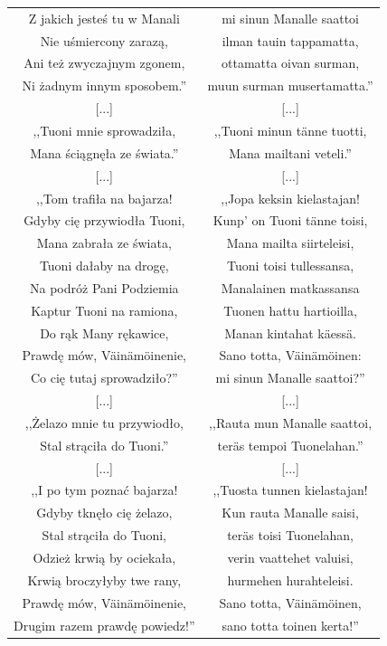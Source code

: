 \documentclass[11pt,a4paper,twoside]{report}
\begin{document}
{\begin{longtable}{c c}
Z jakich jesteś tu w Manali		&  mi sinun Manalle saattoi \\
Nie uśmiercony zarazą, 			&  ilman tauin tappamatta, \\
Ani też zwyczajnym zgonem, 		&  ottamatta oivan surman, \\
Ni żadnym innym sposobem.'' 		&  muun surman musertamatta.'' \\
{[...]} & {[...]}\\
,,Tuoni mnie sprowadziła, 		&  ,,Tuoni minun tänne tuotti, \\
Mana ściągnęła ze świata.'' 	&  Mana mailtani veteli.'' \\
{[...]} & {[...]}\\
,,Tom trafiła na bajarza! 			&  ,,Jopa keksin kielastajan! \\
Gdyby cię przywiodła Tuoni, 		&  Kunp' on Tuoni tänne toisi, \\
Mana zabrała ze świata, 			&  Mana mailta siirteleisi, \\
Tuoni dałaby na drogę, 			&  Tuoni toisi tullessansa, \\
Na podróż Pani Podziemia		&  Manalainen matkassansa	 \\
Kaptur Tuoni na ramiona, 		&  Tuonen hattu hartioilla, \\
Do rąk Many rękawice, 			&  Manan kintahat käessä. \\
Prawdę mów, Väinämöinenie, 		&  Sano totta, Väinämöinen: \\
Co cię tutaj sprowadziło?'' 		&  mi sinun Manalle saattoi?'' \\
{[...]} & {[...]}\\
,,Żelazo mnie tu przywiodło, 		&  ,,Rauta mun Manalle saattoi, \\
Stal strąciła do Tuoni.'' 			&  teräs tempoi Tuonelahan.'' \\
{[...]} & {[...]}\\
,,I po tym poznać bajarza! 		&  ,,Tuosta tunnen kielastajan! \\
Gdyby tknęło cię żelazo, 			&  Kun rauta Manalle saisi, \\
Stal strąciła do Tuoni, 			&  teräs toisi Tuonelahan, \\
Odzież krwią by ociekała, 		&  verin vaattehet valuisi, \\
Krwią broczyłyby twe rany, 		&  hurmehen hurahteleisi. \\
Prawdę mów, Väinämöinenie, 		&  Sano totta, Väinämöinen, \\
Drugim razem prawdę powiedz!'' 	&  sano totta toinen kerta!'' \\

\end{longtable}}
\end{document}
